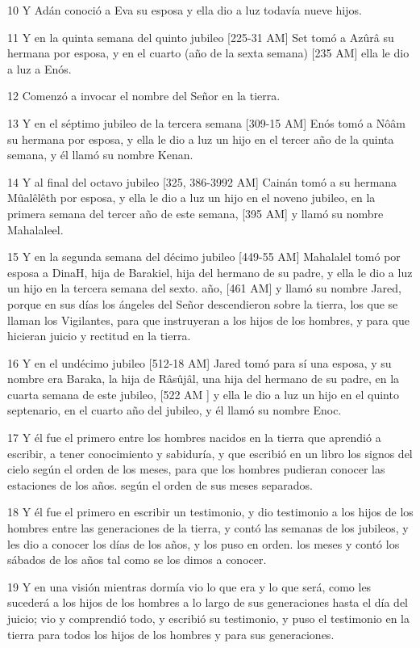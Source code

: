 \par 10 Y Adán conoció a Eva su esposa y ella dio a luz todavía nueve hijos.
\par 11 Y en la quinta semana del quinto jubileo [225-31 AM] Set tomó a Azûrâ su hermana por esposa, y en el cuarto (año de la sexta semana) [235 AM] ella le dio a luz a Enós.
\par 12 Comenzó a invocar el nombre del Señor en la tierra.
\par 13 Y en el séptimo jubileo de la tercera semana [309-15 AM] Enós tomó a Nôâm su hermana por esposa, y ella le dio a luz un hijo en el tercer año de la quinta semana, y él llamó su nombre Kenan.
\par 14 Y al final del octavo jubileo [325, 386-3992 AM] Cainán tomó a su hermana Mûalêlêth por esposa, y ella le dio a luz un hijo en el noveno jubileo, en la primera semana del tercer año de este semana, [395 AM] y llamó su nombre Mahalaleel.
\par 15 Y en la segunda semana del décimo jubileo [449-55 AM] Mahalalel tomó por esposa a DinaH, hija de Barakiel, hija del hermano de su padre, y ella le dio a luz un hijo en la tercera semana del sexto. año, [461 AM] y llamó su nombre Jared, porque en sus días los ángeles del Señor descendieron sobre la tierra, los que se llaman los Vigilantes, para que instruyeran a los hijos de los hombres, y para que hicieran juicio y rectitud en la tierra.
\par 16 Y en el undécimo jubileo [512-18 AM] Jared tomó para sí una esposa, y su nombre era Baraka, la hija de Râsûjâl, una hija del hermano de su padre, en la cuarta semana de este jubileo, [522 AM ] y ella le dio a luz un hijo en el quinto septenario, en el cuarto año del jubileo, y él llamó su nombre Enoc.
\par 17 Y él fue el primero entre los hombres nacidos en la tierra que aprendió a escribir, a tener conocimiento y sabiduría, y que escribió en un libro los signos del cielo según el orden de los meses, para que los hombres pudieran conocer las estaciones de los años. según el orden de sus meses separados.
\par 18 Y él fue el primero en escribir un testimonio, y dio testimonio a los hijos de los hombres entre las generaciones de la tierra, y contó las semanas de los jubileos, y les dio a conocer los días de los años, y los puso en orden. los meses y contó los sábados de los años tal como se los dimos a conocer.
\par 19 Y en una visión mientras dormía vio lo que era y lo que será, como les sucederá a los hijos de los hombres a lo largo de sus generaciones hasta el día del juicio; vio y comprendió todo, y escribió su testimonio, y puso el testimonio en la tierra para todos los hijos de los hombres y para sus generaciones.
